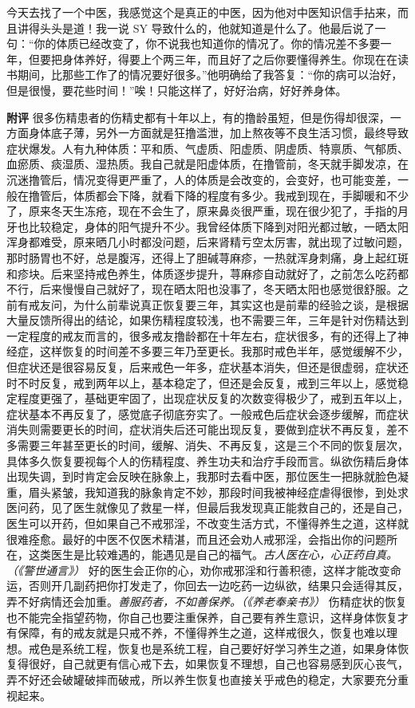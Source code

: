 \begin{case}
    今天去找了一个中医，我感觉这个是真正的中医，因为他对中医知识信手拈来，而且讲得头头是道！我一说 SY 导致什么的，他就知道是什么了。他最后说了一句：“你的体质已经改变了，你不说我也知道你的情况了。你的情况差不多要一年，但要把身体养好，得要上个两三年，而且好了之后你要懂得养生。你现在在读书期间，比那些工作了的情况要好很多。”他明确给了我答复：“你的病可以治好，但是很慢，要花些时间！”唉！只能这样了，好好治病，好好养身体。

    \textbf{附评} 很多伤精患者的伤精史都有十年以上，有的撸龄虽短，但是伤得却很深，一方面身体底子薄，另外一方面就是狂撸滥泄，加上熬夜等不良生活习惯，最终导致症状爆发。人有九种体质：平和质、气虚质、阳虚质、阴虚质、特禀质、气郁质、血瘀质、痰湿质、湿热质。我自己就是阳虚体质，在撸管前，冬天就手脚发凉，在沉迷撸管后，情况变得更严重了，人的体质是会改变的，会变好，也可能变差，一般在撸管后，体质都会下降，就看下降的程度有多少。我戒到现在，手脚暖和不少了，原来冬天生冻疮，现在不会生了，原来鼻炎很严重，现在很少犯了，手指的月牙也比较稳定，身体的阳气提升不少。我曾经体质下降到对阳光都过敏，一晒太阳浑身都难受，原来晒几小时都没问题，后来肾精亏空太厉害，就出现了过敏问题，那时肠胃也不好，总是腹泻，还得上了胆碱荨麻疹，一热就浑身刺痛，身上起红斑和疹块。后来坚持戒色养生，体质逐步提升，荨麻疹自动就好了，之前怎么吃药都不行，后来慢慢自己就好了，现在晒太阳也没事了，冬天晒太阳也感觉很舒服。之前有戒友问，为什么前辈说真正恢复要三年，其实这也是前辈的经验之谈，是根据大量反馈所得出的结论，如果伤精程度较浅，也不需要三年，三年是针对伤精达到一定程度的戒友而言的，很多戒友撸龄都在十年左右，症状很多，有的还得上了神经症，这样恢复的时间差不多要三年乃至更长。我那时戒色半年，感觉缓解不少，但症状还是很容易反复，后来戒色一年多，症状基本消失，但还是很虚弱，症状还时不时反复，戒到两年以上，基本稳定了，但还是会反复，戒到三年以上，感觉稳定程度更强了，基础更牢固了，出现症状反复的次数变得极少了，戒到五年以上，症状基本不再反复了，感觉底子彻底夯实了。一般戒色后症状会逐步缓解，而症状消失则需要更长的时间，症状消失后还可能出现反复，要做到症状不再反复，差不多需要三年甚至更长的时间，缓解、消失、不再反复，这是三个不同的恢复层次，具体多久恢复要视每个人的伤精程度、养生功夫和治疗手段而言。纵欲伤精后身体出现失调，到时肯定会反映在脉象上，我那时去看中医，那位医生一把脉就脸色凝重，眉头紧皱，我知道我的脉象肯定不妙，那段时间我被神经症虐得很惨，到处求医问药，见了医生就像见了救星一样，但最后我发现真正能救自己的，还是自己，医生可以开药，但如果自己不戒邪淫，不改变生活方式，不懂得养生之道，这样就很难痊愈。最好的中医不仅医术精湛，而且还会劝人戒邪淫，会指出你的问题所在，这类医生是比较难遇的，能遇见是自己的福气。\textit{古人医在心，心正药自真。（《警世通言》）} 好的医生会正你的心，劝你戒邪淫和行善积德，这样才能改变命运，否则开几副药把你打发走了，你回去一边吃药一边纵欲，结果只会适得其反，弄不好病情还会加重。\textit{善服药者，不如善保养。（《养老奉亲书》）} 伤精症状的恢复也不能完全指望药物，你自己也要注重保养，自己要有养生意识，这样身体恢复才有保障，有的戒友就是只戒不养，不懂得养生之道，这样戒很久，恢复也难以理想。戒色是系统工程，恢复也是系统工程，自己要好好学习养生之道，如果身体恢复得很好，自己就更有信心戒下去，如果恢复不理想，自己也容易感到灰心丧气，弄不好还会破罐破摔而破戒，所以养生恢复也直接关乎戒色的稳定，大家要充分重视起来。
\end{case}


